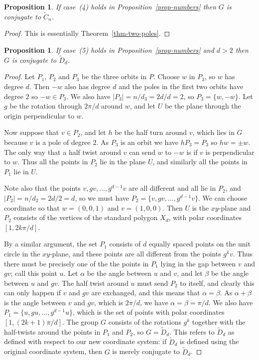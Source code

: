\documentclass{amsart}
\newcommand{\tC}        {\widetilde{C}}
\newcommand{\tD}        {\widetilde{D}}
\newcommand{\al}        {\alpha}
\newcommand{\bt}        {\beta}
\renewcommand{\:}{\colon}
\newtheorem{proposition}[theorem]{Proposition}
\theoremstyle{definition}
\begin{document}
\begin{proposition}\label{prop-class-cyclic}
 If case~(4) holds in Proposition~\ref{prop-numbers} then $G$ is
 conjugate to $\tC_n$.
\end{proposition}
\begin{proof}
 This is essentially Theorem~\ref{thm-two-poles}.
\end{proof}

\begin{proposition}\label{prop-class-dihedral}
 If case~(5) holds in Proposition~\ref{prop-numbers} and $d>2$ then
 $G$ is conjugate to $\tD_d$.
\end{proposition}
\begin{proof}
 Let $P_1$, $P_2$ and $P_3$ be the three orbits in $P$.  Choose $w$ in
 $P_3$, so $w$ has degree $d$.  Then $-w$ also has degree $d$ and the
 poles in the first two orbits have degree $2$ so $-w\in P_3$.  We
 also have $|P_3|=n/d_3=2d/d=2$, so $P_3=\{w,-w\}$.  Let $g$ be the
 rotation through $2\pi/d$ around $w$, and let $U$ be the plane
 through the origin perpendicular to $w$.

 Now suppose that $v\in P_2$, and let $h$ be the half turn around $v$,
 which lies in $G$ because $v$ is a pole of degree $2$.  As $P_3$ is
 an orbit we have $hP_3=P_3$ so $hw=\pm w$.  The only way that a half
 twist around $v$ can send $w$ to $-w$ is if $v$ is perpendicular to
 $w$.  Thus all the points in $P_2$ lie in the plane $U$, and
 similarly all the points in $P_1$ lie in $U$.

 Note also that the points $v,gv,\ldots,g^{d-1}v$ are all different
 and all lie in $P_2$, and $|P_2|=n/d_2=2d/2=d$, so we must have
 $P_2=\{v,gv,\ldots,g^{d-1}v\}$.  We can choose coordinate so that
 $w=(0,0,1)$ and $v=(1,0,0)$.  Then $U$ is the $xy$-plane and $P_2$
 consists of the vertices of the standard polygon $X_d$, with polar
 coordinates $[1,2k\pi/d]$.

 By a similar argument, the set $P_1$ consists of $d$ equally spaced
 points on the unit circle in the $xy$-plane, and these points are all
 different from the points $g^kv$.  Thus there must be precisely one
 of the the points in $P_1$ lying in the gap between $v$ and $gv$;
 call this point $u$.  Let $\al$ be the angle between $u$ and $v$, and
 let $\bt$ be the angle between $u$ and $gv$.  The half twist around
 $u$ must send $P_2$ to itself, and clearly this can only happen if
 $v$ and $gv$ are exchanged, and this means that $\al=\bt$.  As
 $\al+\bt$ is the angle between $v$ and $gv$, which is $2\pi/d$, we
 have $\al=\bt=\pi/d$.  We also have $P_1=\{u,gu,\ldots,g^{d-1}u\}$,
 which is the set of points with polar coordinates $[1,(2k+1)\pi/d]$.
 The group $G$ consists of the rotations $g^k$ together with the
 half-twists around the points in $P_1$ and $P_2$, so $G=\tD_d$.  This
 refers to $\tD_d$ as defined with respect to our new coordinate
 system: if $\tD_d$ is defined using the original coordinate system,
 then $G$ is merely conjugate to $\tD_d$.
\end{proof}
\end{document}
